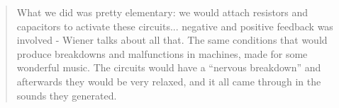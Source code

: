 

\begin{quote}
What we did was pretty elementary: we would attach resistors and capacitors
to activate these
circuits... negative and positive feedback was involved - Wiener
talks about all that. The same
conditions that would produce breakdowns and malfunctions in machines,
made for some
wonderful music. The circuits would have a “nervous breakdown”
and afterwards they would be
very relaxed, and it all came through in the sounds they generated.
\end{quote}

